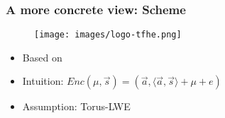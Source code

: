 \documentclass[lualatex, 9pt]{beamer}
\begin{document}
\begin{comment}

\begin{frame}
	\frametitle{A more concrete view}
	Goal: Make FHE practical for real life applications.\\
	\begin{itemize}
		\item<2-> \cite{chillotti2016faster,chillotti2019tfhe} TFHE: State of the art FHE scheme \begin{enumerate}
			\item<3-> Based on \cite{gentry2013homomorphic}
			\item<3-> Intuition: $Enc(\mu,\vec{s}) = (\vec{a},\langle \vec{a},\vec{s} \rangle + \mu + e)$
			\item<3-> Assumption: Torus-LWE\\[0.5cm]
		\end{enumerate} 
		\item<4-> \cite{bourse2018fast} FHE on NN \begin{enumerate}
			\item<5-> Uses TFHE
			\item<5-> Discrete NN to recognize digits
			\item<5-> Runs on encrypted data\\[0.5cm]
		\end{enumerate}
		\item<6-> NVIDIA: CUDA \begin{enumerate}
			\item<7-> Cluster uses Tesla K80
			\item<7-> Optimized libraries for NVIDIA GPUs.
			\item<7-> Outdated OpenCL version (1.2)\\[0.1em]
			\item<7->[] {\tikz\node[inner sep=0pt, opacity=0.5]{Can use PTX assembly};}
		\end{enumerate}
	
	\end{itemize}
\end{frame}

\end{comment}

\begin{frame}
\frametitle{A more concrete view: Scheme}
	\begin{figure}[h]
		\centering
	\texttt{[image: images/logo-tfhe.png]}
	\caption{\cite{chillotti2019tfhe,chillotti2016faster}}
	\end{figure}
	\begin{itemize}
		\item<2-> Based on \cite{gentry2013homomorphic}
		\item<2-> Intuition: $Enc(\mu,\vec{s}) = (\vec{a},\langle \vec{a},\vec{s} \rangle + \mu + e)$
		\item<2-> Assumption: Torus-LWE\\[0.5cm] 
	\end{itemize}
\end{frame}
\end{document}
